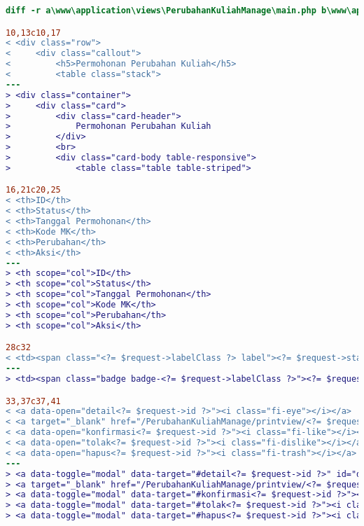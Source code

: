 \begin{lstlisting}[language=diff, caption=Perubahan file \path{\views\PerubahanKuliahManage\main.php},  basicstyle=\ttfamily, frame=single,
columns=fullflexible, keepspaces=true, breaklines=true, label={lst:mainPerubahanKuliahManage}]
diff -r a\www\application\views\PerubahanKuliahManage\main.php b\www\application\views\PerubahanKuliahManage\main.php

10,13c10,17
< <div class="row">
<     <div class="callout">
<         <h5>Permohonan Perubahan Kuliah</h5>
<         <table class="stack">
---
> <div class="container">
>     <div class="card">
>         <div class="card-header">
>             Permohonan Perubahan Kuliah
>         </div>
>         <br>
>         <div class="card-body table-responsive">
>             <table class="table table-striped">

16,21c20,25
< <th>ID</th>
< <th>Status</th>
< <th>Tanggal Permohonan</th>
< <th>Kode MK</th>
< <th>Perubahan</th>
< <th>Aksi</th>
---
> <th scope="col">ID</th>
> <th scope="col">Status</th>
> <th scope="col">Tanggal Permohonan</th>
> <th scope="col">Kode MK</th>
> <th scope="col">Perubahan</th>
> <th scope="col">Aksi</th>

28c32
< <td><span class="<?= $request->labelClass ?> label"><?= $request->status ?></span></td>
---
> <td><span class="badge badge-<?= $request->labelClass ?>"><?= $request->status ?></span></td>

33,37c37,41
< <a data-open="detail<?= $request->id ?>"><i class="fi-eye"></i></a>
< <a target="_blank" href="/PerubahanKuliahManage/printview/<?= $request->id ?>"><i class="fi-print"></i></a>
< <a data-open="konfirmasi<?= $request->id ?>"><i class="fi-like"></i></a>                                    
< <a data-open="tolak<?= $request->id ?>"><i class="fi-dislike"></i></a>
< <a data-open="hapus<?= $request->id ?>"><i class="fi-trash"></i></a>
---
> <a data-toggle="modal" data-target="#detail<?= $request->id ?>" id="detailIkon<?= $request->id ?>"><i class="fas fa-eye blueiconcolor"></i></a>
> <a target="_blank" href="/PerubahanKuliahManage/printview/<?= $request->id ?>"><i class="fas fa-print"></i></a>
> <a data-toggle="modal" data-target="#konfirmasi<?= $request->id ?>"><i class="fas fa-thumbs-up"></i></a>
> <a data-toggle="modal" data-target="#tolak<?= $request->id ?>"><i class="fas fa-thumbs-down"></i></a>
> <a data-toggle="modal" data-target="#hapus<?= $request->id ?>"><i class="fas fa-trash"></i></a>


\end{lstlisting}
